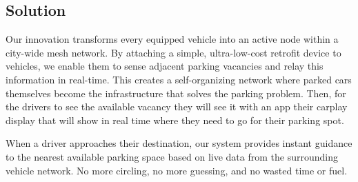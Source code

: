 \subsection{Solution}
Our innovation transforms every equipped vehicle into an active node within a city-wide mesh network. By attaching a simple, ultra-low-cost retrofit device to vehicles, we enable them to sense adjacent parking vacancies and relay this information in real-time. This creates a self-organizing network where parked cars themselves become the infrastructure that solves the parking problem. Then, for the drivers to see the available vacancy they will see it with an app their carplay display that will show in real time where they need to go for their parking spot.

When a driver approaches their destination, our system provides instant guidance to the nearest available parking space based on live data from the surrounding vehicle network. No more circling, no more guessing, and no wasted time or fuel.